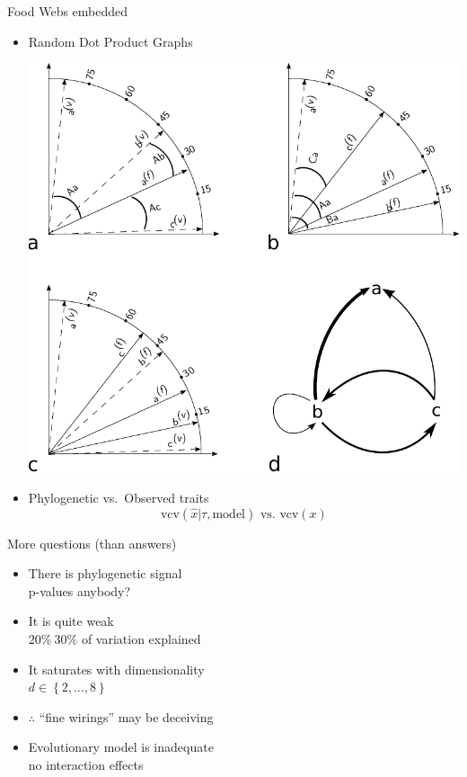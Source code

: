 \documentclass[]{beamer}
\begin{document}
\begin{frame}{Food Webs embedded}

\begin{itemize}[<+->]
\centering
\item
Random Dot Product Graphs

  \includegraphics[width=0.4\linewidth]{images/RDPGmodel.pdf}

\item
Phylogenetic vs.~Observed traits
  \begin{equation*}
    \textrm{vcv}\left( \hat{x} | \tau, \mbox{model} \right) \mbox{ vs. } \textrm{vcv}\left(x\right)
  \end{equation*}

\end{itemize}

\end{frame}

\begin{frame}{More questions (than answers)}

\begin{itemize}[<+->]
\itemsep1pt\parskip0pt
\item
  There is phylogenetic signal\\
  {\tiny p-values anybody?}
\item
  It is quite weak\\
  {\tiny $20\% ~ 30\%$ of variation explained}
\item
  It saturates with dimensionality\\
  {\tiny $d \in \left\{2, \dots , 8 \right\}$}
\item
  $\therefore$ ``fine wirings'' may be deceiving
\item
  Evolutionary model is inadequate\\
  {\tiny no interaction effects}
\end{itemize}

\end{frame}
\end{document}
